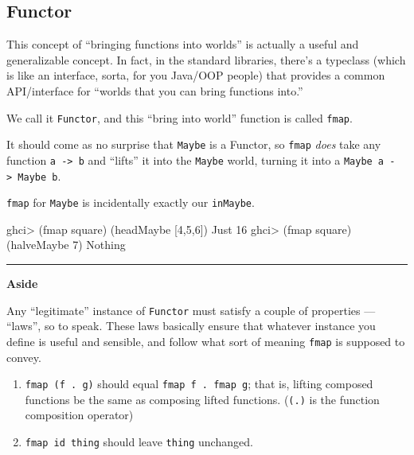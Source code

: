 \documentclass[]{article}
\newenvironment{Shaded}{}{}
\newcommand{\DataTypeTok}[1]{\textcolor[rgb]{0.56,0.13,0.00}{{#1}}}
\newcommand{\DecValTok}[1]{\textcolor[rgb]{0.25,0.63,0.44}{{#1}}}
\newcommand{\FunctionTok}[1]{\textcolor[rgb]{0.02,0.16,0.49}{{#1}}}
\newcommand{\NormalTok}[1]{{#1}}
\begin{document}
\subsection{Functor}\label{functor}

This concept of ``bringing functions into worlds'' is actually a useful
and generalizable concept. In fact, in the standard libraries, there's a
typeclass (which is like an interface, sorta, for you Java/OOP people)
that provides a common API/interface for ``worlds that you can bring
functions into.''

We call it \texttt{Functor}, and this ``bring into world'' function is
called \texttt{fmap}.

It should come as no surprise that \texttt{Maybe} is a Functor, so
\texttt{fmap} \emph{does} take any function
\texttt{a\ -\textgreater{}\ b} and ``lifts'' it into the \texttt{Maybe}
world, turning it into a \texttt{Maybe\ a\ -\textgreater{}\ Maybe\ b}.

\texttt{fmap} for \texttt{Maybe} is incidentally exactly our
\texttt{inMaybe}.

\begin{Shaded}
\begin{Highlighting}[]
\NormalTok{ghci}\FunctionTok{>} \NormalTok{(fmap square) (headMaybe [}\DecValTok{4}\NormalTok{,}\DecValTok{5}\NormalTok{,}\DecValTok{6}\NormalTok{])}
\DataTypeTok{Just} \DecValTok{16}
\NormalTok{ghci}\FunctionTok{>} \NormalTok{(fmap square) (halveMaybe }\DecValTok{7}\NormalTok{)}
\DataTypeTok{Nothing}
\end{Highlighting}
\end{Shaded}

\begin{center}\rule{0.5\linewidth}{\linethickness}\end{center}

\textbf{Aside}

Any ``legitimate'' instance of \texttt{Functor} must satisfy a couple of
properties --- ``laws'', so to speak. These laws basically ensure that
whatever instance you define is useful and sensible, and follow what
sort of meaning \texttt{fmap} is supposed to convey.

\begin{enumerate}
\def\labelenumi{\arabic{enumi}.}
\tightlist
\item
  \texttt{fmap\ (f\ .\ g)} should equal \texttt{fmap\ f\ .\ fmap\ g};
  that is, lifting composed functions be the same as composing lifted
  functions. (\texttt{(.)} is the function composition operator)
\item
  \texttt{fmap\ id\ thing} should leave \texttt{thing} unchanged.
\end{enumerate}
\end{document}
